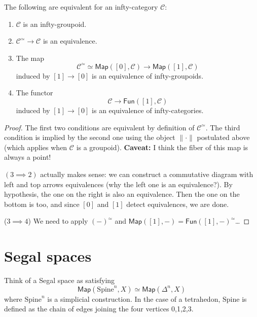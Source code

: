 \begin{lemma}
\label{lemma-equiv-infty-group}
The following are equivalent for an
infty-category $\mathcal{C}$:
\begin{enumerate}
\item $\mathcal{C}$ is an infty-groupoid.

\item $\mathcal{C}^\simeq \to \mathcal{C}$ is
an equivalence.

\item The map
$$
\mathcal{C}^\simeq \simeq
\mathsf{Map}([0],\mathcal{C})
\to \mathsf{Map}([1],\mathcal{C})
$$
induced by $[1] \to [0]$ is an equivalence
of infty-groupoids.

\item The functor
$$
\mathcal{C}\to \mathsf{Fun}([1],\mathcal{C})
$$
induced by $[1]\to [0]$ is an equivalence
of infty-categories.
\end{enumerate}
\end{lemma}

\begin{proof}
The first two conditions are equivalent by
definition
of $\mathcal{C}^{\simeq}$. The third
condition is implied
by the second one using the object
$\|\cdot\|$ postulated above
(which applies when $\mathcal{C}$ is a
groupoid).
{\bf Caveat:} I think the fiber of this map
is always a point!

$(3\implies 2)$ actually makes sense:
we can construct a commutative diagram with
left and top arrows
equivalences (why the left one is an
equivalence?).
By hypothesis, the one on the right is also
an equivalence.
Then the one on the bottom is too, and since
$[0]$ and $[1]$
detect equivalences, we are done.

($3 \implies 4$) We need to apply
$(-)^\simeq$ and
$\mathsf{Map}([1],-)=\mathsf{Fun}([1],-)
^\simeq$…
\end{proof}

\section{Segal spaces}
\label{section-segal}


\begin{remark}
\label{remark-Segal-spaces}
Think of a Segal space as satisfying
$$
\mathsf{Map}(\text{Spine}^n,X) \simeq
\mathsf{Map}(\Delta^n,X)
$$
where $\text{Spine}^n$ is a simplicial
construction.
In the case of a tetrahedon, $\text{Spine}$
is defined as the
chain of edges joining the four vertices
0,1,2,3.
\end{remark}


